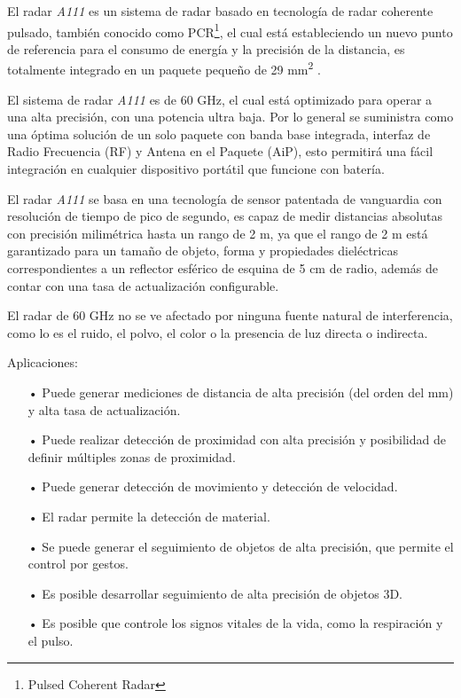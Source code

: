 El radar \textit{A111} es un sistema de radar basado en tecnología de radar coherente pulsado, también conocido como PCR\footnote{Pulsed Coherent Radar}, el cual está estableciendo un nuevo punto de referencia para el consumo de energía y la precisión de la distancia, es totalmente integrado en un paquete pequeño de 29 mm\textsuperscript{2} \cite{Acconeer2021}.

El sistema de radar \textit{A111} es de 60 GHz, el cual está optimizado para operar a una alta precisión, con una potencia ultra baja. Por lo general se suministra como una óptima solución de un solo paquete con banda base integrada, interfaz de Radio Frecuencia (RF) y Antena en el Paquete (AiP), esto permitirá una fácil integración en cualquier dispositivo portátil que funcione con batería.

El radar \textit{A111} se basa en una tecnología de sensor patentada de vanguardia con resolución de tiempo de pico de segundo, es capaz de medir distancias absolutas con precisión milimétrica hasta un rango de 2 m, ya que el rango de 2 m está garantizado para un tamaño de objeto, forma y propiedades dieléctricas correspondientes a un reflector esférico de esquina de 5 cm de radio, además de contar con una tasa de actualización configurable.

El radar de 60 GHz no se ve afectado por ninguna fuente natural de interferencia, como lo es el ruido, el polvo, el color o la presencia de luz directa o indirecta.


Aplicaciones:
\begin{itemize}
	\item[•] Puede generar mediciones de distancia de alta precisión (del orden del mm) y alta tasa de actualización.
	\item[•] Puede realizar detección de proximidad con alta precisión y posibilidad de definir múltiples zonas de proximidad.
	\item[•] Puede generar detección de movimiento y detección de velocidad.
	\item[•] El radar permite la detección de material.
	\item[•] Se puede generar el seguimiento de objetos de alta precisión, que permite el control por gestos.
	\item[•] Es posible desarrollar seguimiento de alta precisión de objetos 3D.
	\item[•] Es posible que controle los signos vitales de la vida, como la respiración y el pulso.
\end{itemize}

